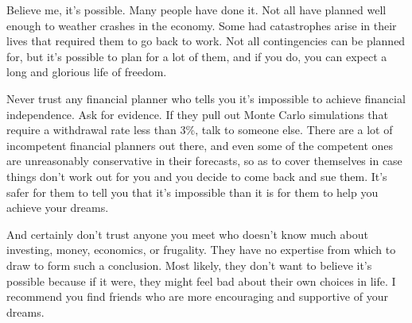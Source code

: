 Believe me, it's possible. Many people have done it. Not all have planned well enough to weather crashes in the economy. Some had catastrophes arise in their lives that required them to go back to work. Not all contingencies can be planned for, but it's possible to plan for a lot of them, and if you do, you can expect a long and glorious life of freedom.

Never trust any financial planner who tells you it's impossible to achieve financial independence. Ask for evidence. If they pull out Monte Carlo simulations that require a withdrawal rate less than 3\%, talk to someone else. There are a lot of incompetent financial planners out there, and even some of the competent ones are unreasonably conservative in their forecasts, so as to cover themselves in case things don't work out for you and you decide to come back and sue them. It's safer for them to tell you that it's impossible than it is for them to help you achieve your dreams.

And certainly don't trust anyone you meet who doesn't know much about investing, money, economics, or frugality. They have no expertise from which to draw to form such a conclusion. Most likely, they don't want to believe it's possible because if it were, they might feel bad about their own choices in life. I recommend you find friends who are more encouraging and supportive of your dreams.
